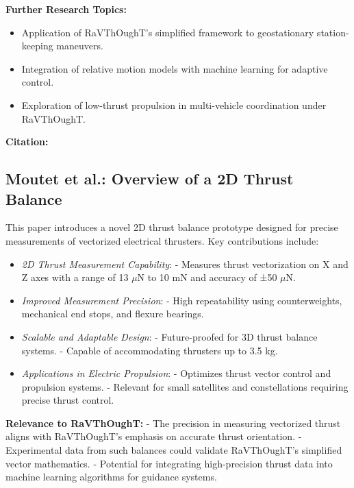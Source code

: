 \textbf{Further Research Topics:}
\begin{itemize}
  \item Application of RaVThOughT's simplified framework to geostationary station-keeping maneuvers.
  \item Integration of relative motion models with machine learning for adaptive control.
  \item Exploration of low-thrust propulsion in multi-vehicle coordination under RaVThOughT.
\end{itemize}

\textbf{Citation:} 

\subsection{Moutet et al.: Overview of a 2D Thrust Balance}

This paper introduces a novel 2D thrust balance prototype designed for precise measurements of vectorized electrical thrusters. Key contributions include:

\begin{itemize}
  \item \textit{2D Thrust Measurement Capability}:
  - Measures thrust vectorization on X and Z axes with a range of 13 \(\mu\text{N}\) to 10 \(\text{mN}\) and accuracy of ±50 \(\mu\text{N}\).

  \item \textit{Improved Measurement Precision}:
  - High repeatability using counterweights, mechanical end stops, and flexure bearings.

  \item \textit{Scalable and Adaptable Design}:
  - Future-proofed for 3D thrust balance systems.
  - Capable of accommodating thrusters up to 3.5 kg.

  \item \textit{Applications in Electric Propulsion}:
  - Optimizes thrust vector control and propulsion systems.
  - Relevant for small satellites and constellations requiring precise thrust control.
\end{itemize}

\textbf{Relevance to RaVThOughT:}
- The precision in measuring vectorized thrust aligns with RaVThOughT's emphasis on accurate thrust orientation.
- Experimental data from such balances could validate RaVThOughT's simplified vector mathematics.
- Potential for integrating high-precision thrust data into machine learning algorithms for guidance systems.

